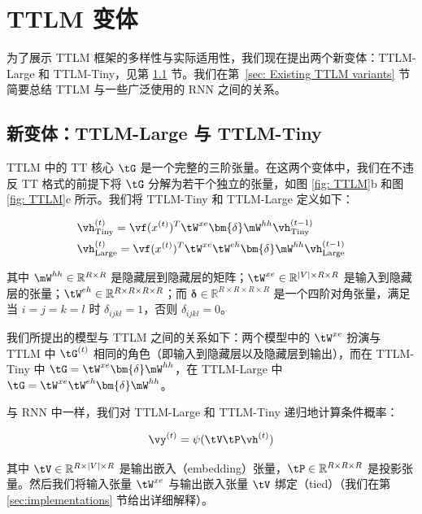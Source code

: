 \section{TTLM 变体}

为了展示 TTLM 框架的多样性与实际适用性，我们现在提出两个新变体：TTLM-Large 和 TTLM-Tiny，见第 \ref{sec: Tinyttlm} 节。我们在第\ \ref{sec: Existing  TTLM variants} 节简要总结 TTLM 与一些广泛使用的 RNN 之间的关系。

\subsection{新变体：TTLM-Large 与 TTLM-Tiny}
\label{sec: Tinyttlm}

TTLM 中的 TT 核心 $\tG$ 是一个完整的三阶张量。在这两个变体中，我们在不违反 TT 格式的前提下将 $\tG$ 分解为若干个独立的张量，如图 \ref{fig: TTLM}b 和图 \ref{fig: TTLM}c 所示。我们将 TTLM-Tiny 和 TTLM-Large 定义如下：

\begin{equation}
\begin{split}
& \vh^{(t)}_{\textrm{Tiny}} = \vf (x^{(t)})^T \tW^{xe} \bm{\delta} \mW^{hh}\vh^{(t-1)}_{\textrm{Tiny}}\\
& \vh^{(t)}_{\textrm{Large}}  = \vf (x^{(t)})^T \tW^{xe} \tW^{eh}  \bm{\delta} \mW^{hh}\vh^{(t-1)}_{\textrm{Large}}\\
\end{split}
\end{equation}

其中 $\mW^{hh} \in \mathbb{R}^{R \times R}$ 是隐藏层到隐藏层的矩阵；$\tW^{xe} \in \mathbb{R}^{|V| \times R \times R}$ 是输入到隐藏层的张量；$\tW^{eh} \in \mathbb{R}^{R \times R \times R \times R}$；而 $\bm{\delta} \in  \mathbb{R}^{R \times R \times R \times R}$ 是一个四阶对角张量，满足当 $i = j = k = l$ 时 $\delta_{ijkl} = 1$，否则 $\delta_{ijkl} = 0$。


我们所提出的模型与 TTLM 之间的关系如下：两个模型中的 $\tW^{xe}$ 扮演与 TTLM 中 $\tG^{(t)}$ 相同的角色（即输入到隐藏层以及隐藏层到输出），而在 TTLM-Tiny 中 $\tG = \tW^{xe} \bm{\delta} \mW^{hh}$，在 TTLM-Large 中 $\tG = \tW^{xe} \tW^{eh} \bm{\delta} \mW^{hh}$。


与 RNN 中一样，我们对 TTLM-Large 和 TTLM-Tiny 递归地计算条件概率：

\begin{equation}
\vy^{(t)} = \psi (\tV\tP\vh^{(t)})
\end{equation}

其中 $\tV\in\mathbb{R}^{R \times |V|\times R}$ 是输出嵌入（embedding）张量，$\tP\in\mathbb{R}^{R \times R\times R}$ 是投影张量。然后我们将输入张量 $\tW^{xe}$ 与输出嵌入张量 $\tV$ 绑定（tied）（我们在第 \ref{sec:implementations} 节给出详细解释）。

